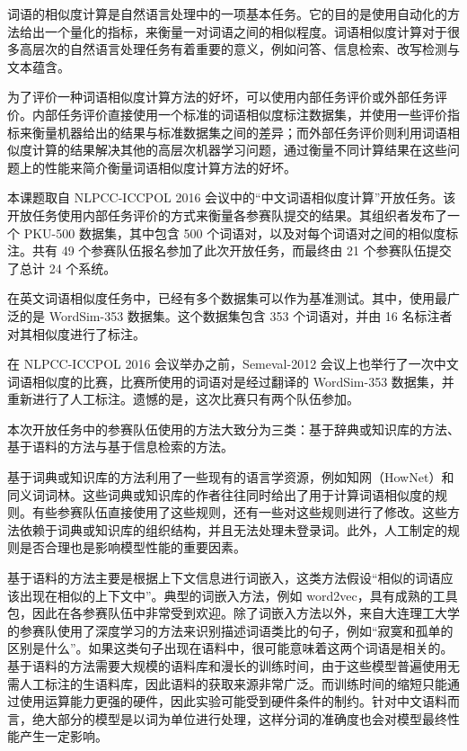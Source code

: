 
词语的相似度计算是自然语言处理中的一项基本任务。它的目的是使用自动化的方法给出一个量化的指标，来衡量一对词语之间的相似程度。词语相似度计算对于很多高层次的自然语言处理任务有着重要的意义，例如问答、信息检索、改写检测与文本蕴含。

为了评价一种词语相似度计算方法的好坏，可以使用内部任务评价或外部任务评价。内部任务评价直接使用一个标准的词语相似度标注数据集，并使用一些评价指标来衡量机器给出的结果与标准数据集之间的差异；而外部任务评价则利用词语相似度计算的结果解决其他的高层次机器学习问题，通过衡量不同计算结果在这些问题上的性能来简介衡量词语相似度计算方法的好坏。

本课题取自 NLPCC-ICCPOL 2016 会议中的“中文词语相似度计算”开放任务。该开放任务使用内部任务评价的方式来衡量各参赛队提交的结果。其组织者发布了一个 PKU-500 数据集，其中包含 500 个词语对，以及对每个词语对之间的相似度标注。共有 49 个参赛队伍报名参加了此次开放任务，而最终由 21 个参赛队伍提交了总计 24 个系统。

在英文词语相似度任务中，已经有多个数据集可以作为基准测试。其中，使用最广泛的是 WordSim-353 数据集。这个数据集包含 353 个词语对，并由 16 名标注者对其相似度进行了标注。

在 NLPCC-ICCPOL 2016 会议举办之前，Semeval-2012 会议上也举行了一次中文词语相似度的比赛，比赛所使用的词语对是经过翻译的 WordSim-353 数据集，并重新进行了人工标注。遗憾的是，这次比赛只有两个队伍参加。

本次开放任务中的参赛队伍使用的方法大致分为三类：基于辞典或知识库的方法、基于语料的方法与基于信息检索的方法。

基于词典或知识库的方法利用了一些现有的语言学资源，例如知网（HowNet）和同义词词林。这些词典或知识库的作者往往同时给出了用于计算词语相似度的规则。有些参赛队伍直接使用了这些规则，还有一些对这些规则进行了修改。这些方法依赖于词典或知识库的组织结构，并且无法处理未登录词。此外，人工制定的规则是否合理也是影响模型性能的重要因素。

基于语料的方法主要是根据上下文信息进行词嵌入，这类方法假设“相似的词语应该出现在相似的上下文中”。典型的词嵌入方法，例如 word2vec，具有成熟的工具包，因此在各参赛队伍中非常受到欢迎。除了词嵌入方法以外，来自大连理工大学的参赛队使用了深度学习的方法来识别描述词语类比的句子，例如“寂寞和孤单的区别是什么”。如果这类句子出现在语料中，很可能意味着这两个词语是相关的。基于语料的方法需要大规模的语料库和漫长的训练时间，由于这些模型普遍使用无需人工标注的生语料库，因此语料的获取来源非常广泛。而训练时间的缩短只能通过使用运算能力更强的硬件，因此实验可能受到硬件条件的制约。针对中文语料而言，绝大部分的模型是以词为单位进行处理，这样分词的准确度也会对模型最终性能产生一定影响。

